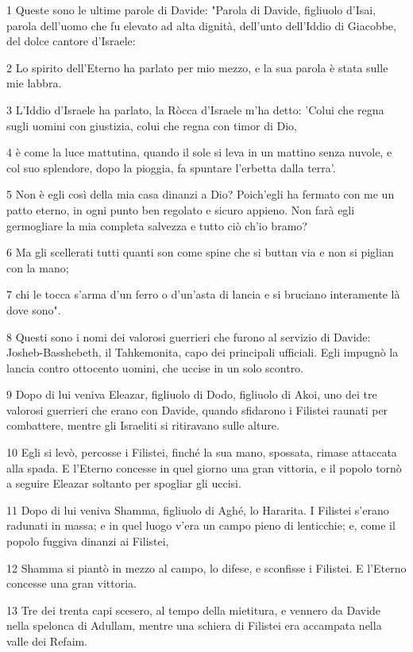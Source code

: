 \par 1 Queste sono le ultime parole di Davide: "Parola di Davide, figliuolo d'Isai, parola dell'uomo che fu elevato ad alta dignità, dell'unto dell'Iddio di Giacobbe, del dolce cantore d'Israele:
\par 2 Lo spirito dell'Eterno ha parlato per mio mezzo, e la sua parola è stata sulle mie labbra.
\par 3 L'Iddio d'Israele ha parlato, la Ròcca d'Israele m'ha detto: 'Colui che regna sugli uomini con giustizia, colui che regna con timor di Dio,
\par 4 è come la luce mattutina, quando il sole si leva in un mattino senza nuvole, e col suo splendore, dopo la pioggia, fa spuntare l'erbetta dalla terra'.
\par 5 Non è egli così della mia casa dinanzi a Dio? Poich'egli ha fermato con me un patto eterno, in ogni punto ben regolato e sicuro appieno. Non farà egli germogliare la mia completa salvezza e tutto ciò ch'io bramo?
\par 6 Ma gli scellerati tutti quanti son come spine che si buttan via e non si piglian con la mano;
\par 7 chi le tocca s'arma d'un ferro o d'un'asta di lancia e si bruciano interamente là dove sono".
\par 8 Questi sono i nomi dei valorosi guerrieri che furono al servizio di Davide: Josheb-Basshebeth, il Tahkemonita, capo dei principali ufficiali. Egli impugnò la lancia contro ottocento uomini, che uccise in un solo scontro.
\par 9 Dopo di lui veniva Eleazar, figliuolo di Dodo, figliuolo di Akoi, uno dei tre valorosi guerrieri che erano con Davide, quando sfidarono i Filistei raunati per combattere, mentre gli Israeliti si ritiravano sulle alture.
\par 10 Egli si levò, percosse i Filistei, finché la sua mano, spossata, rimase attaccata alla spada. E l'Eterno concesse in quel giorno una gran vittoria, e il popolo tornò a seguire Eleazar soltanto per spogliar gli uccisi.
\par 11 Dopo di lui veniva Shamma, figliuolo di Aghé, lo Hararita. I Filistei s'erano radunati in massa; e in quel luogo v'era un campo pieno di lenticchie; e, come il popolo fuggiva dinanzi ai Filistei,
\par 12 Shamma si piantò in mezzo al campo, lo difese, e sconfisse i Filistei. E l'Eterno concesse una gran vittoria.
\par 13 Tre dei trenta capi scesero, al tempo della mietitura, e vennero da Davide nella spelonca di Adullam, mentre una schiera di Filistei era accampata nella valle dei Refaim.
